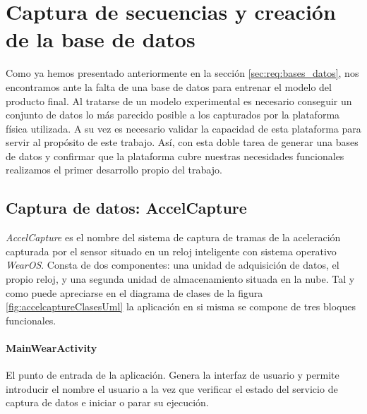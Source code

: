 
\begin{comment}
Aportar detalles del proceso de desarrollo incluyendo fases e hitos del proceso, diagramas representativos de la arquitectura y funcionamiento, capturas de pantalla para ilustrar el funcionamiento, etc.
\end{comment}


\section{Captura de secuencias y creación de la base de datos}
Como ya hemos presentado anteriormente en la sección \ref{sec:req:bases_datos}, nos encontramos ante la falta de una base de datos para entrenar el modelo del producto final. Al tratarse de un modelo experimental es necesario conseguir un conjunto de datos lo más parecido posible a los capturados por la plataforma física utilizada. A su vez es necesario validar la capacidad de esta plataforma para servir al propósito de este trabajo. Así, con esta doble tarea de generar una bases de datos y confirmar que la plataforma cubre nuestras necesidades funcionales realizamos el primer desarrollo propio del trabajo.

\subsection{Captura de datos: AccelCapture}\label{sub:imp:accelcapture}

\textit{AccelCapture} es el nombre del sistema de captura de tramas de la aceleración capturada por el sensor situado en un reloj inteligente con sistema operativo \textit{WearOS}. Consta de dos componentes: una unidad de adquisición de datos, el propio reloj, y una segunda unidad de almacenamiento situada en la nube. Tal y como puede apreciarse en el diagrama de clases de la figura \ref{fig:accelcaptureClasesUml} la aplicación en si misma se compone de tres bloques funcionales.


\paragraph{MainWearActivity}
El punto de entrada de la aplicación. Genera la interfaz de usuario y permite introducir el nombre el usuario a la vez que verificar el estado del servicio de captura de datos e iniciar o parar su ejecución.

